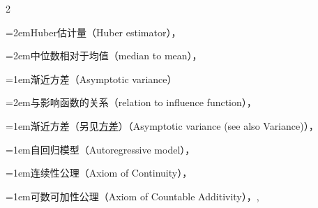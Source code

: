 \begin{multicols}{2}
\par\noindent\hangindent=2em\hspace*{1em}\label{idx:67}Huber估计量（Huber estimator），\hyperref[ex:10.2.7]{\pageref*{ex:10.2.7}}\par
\par\noindent\hangindent=2em\hspace*{1em}\label{idx:68}中位数相对于均值（median to mean），\hyperref[ex:10.2.4]{\pageref*{ex:10.2.4}}\par
\par\addvspace{2pt}
\par\noindent\hangindent=1em\hspace*{0em}\label{idx:69}渐近方差（Asymptotic variance）\par
\par\noindent\hangindent=2em\hspace*{1em}\label{idx:70}与影响函数的关系（relation to influence function），\hyperref[idxocc:70:450]{\pageref*{idxocc:70:450}}\par
\par\addvspace{2pt}
\par\noindent\hangindent=1em\hspace*{0em}\label{idx:71}渐近方差（另见\hyperref[idx:1062]{方差}）（Asymptotic variance (see also Variance)），\hyperref[idxocc:71:410]{\pageref*{idxocc:71:410}}\par
\par\addvspace{2pt}
\par\noindent\hangindent=1em\hspace*{0em}\label{idx:72}自回归模型（Autoregressive model），\hyperref[itm:exercise:10.19:c]{\pageref*{itm:exercise:10.19:c}}\par
\par\addvspace{2pt}
\par\noindent\hangindent=1em\hspace*{0em}\label{idx:73}连续性公理（Axiom of Continuity），\hyperref[exercise:1.12]{\pageref*{exercise:1.12}}\par
\par\addvspace{2pt}
\par\noindent\hangindent=1em\hspace*{0em}\label{idx:74}可数可加性公理（Axiom of Countable Additivity），\hyperref[idxocc:74:38]{\pageref*{idxocc:74:38}}, \hyperref[exercise:1.12]{\pageref*{exercise:1.12}}\par

\end{multicols}
